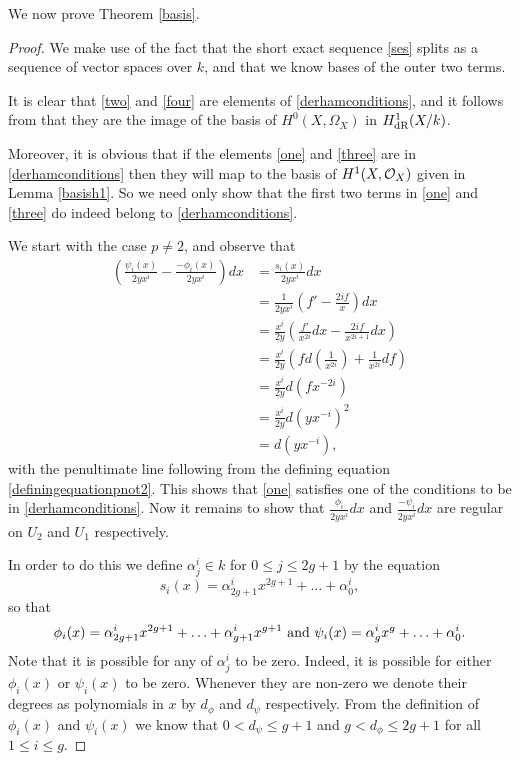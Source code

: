 We now prove Theorem \ref{basis}.

\begin{proof}
We make use of the fact that the short exact sequence \eqref{ses} splits as a sequence of vector spaces over $k$, and that we know bases of the outer two terms.

It is clear that \eqref{two} and \eqref{four} are elements of \eqref{derhamconditions}, and it follows from \cite[Thm 6.1]{faithfulaction} that they are the image of the basis of $H^0(X,\Omega_X)$ in $H_{\text {dR}}^1(X/k)$.

Moreover, it is obvious that if the elements \eqref{one} and \eqref{three} are in \eqref{derhamconditions} then they will map to the basis of $H^1(X,\mathcal{O}_X)$ given in Lemma \ref{basish1}.
So we need only show that the first two terms in \eqref{one} and \eqref{three} do indeed belong to \eqref{derhamconditions}.


We start with the case $p\neq 2$, and observe that
\begin{align*}
\left(  \frac{\psi_i(x)}{2yx^i}  - \frac{-\phi_i(x)}{2yx^i} \right) dx & =  \frac{s_i(x)}{2yx^i} dx \\
& =  \frac{1}{2yx^i} \left( f' - \frac{2if}{x} \right) dx \\
& =  \frac{x^i}{2y} \left( \frac{f'}{x^{2i}}dx -\frac{2if}{x^{2i+1}} dx \right) \\
& =  \frac{x^i}{2y} \left( fd\left(\frac{1}{x^{2i}}\right) + \frac{1}{x^{2i}}df \right) \\
& =  \frac{x^i}{2y}d(fx^{-2i}) \\
& =  \frac{x^i}{2y} d\left(yx^{-i}\right)^2 \\
& =  d(yx^{-i}),
\end{align*}
with the penultimate line following from the defining equation \eqref{definingequationpnot2}.
This shows that \eqref{one} satisfies one of the conditions to be in \eqref{derhamconditions}.
Now it remains to show that $\frac{\phi_i}{2yx^i}dx$ and $\frac{-\psi_i}{2yx^i}dx$ are regular on $U_2$ and $U_1$ respectively.



In order to do this we define $\alpha^i_j \in k$ for $0\leq j \leq 2g+1$ by the equation
\[
s_i(x) = \alpha^i_{2g+1}x^{2g+1} + \ldots + \alpha^i_0,
\]
so that
\[
\phi_i(x) = \alpha^i_{2g+1}x^{2g+1} + \ldots + \alpha^i_{g+1}x^{g+1} \ {\rm and } \ \psi_i(x) = \alpha^i_gx^g + \ldots + \alpha^i_0.
\]
Note that it is possible for any of $\alpha^i_j$ to be zero. Indeed, it is possible for either $\phi_i(x)$ or $\psi_i(x)$ to be zero.
Whenever they are non-zero we denote their degrees as polynomials in $x$ by $d_\phi$ and $d_\psi$ respectively. From the definition of $\phi_i(x)$ and $\psi_i(x)$ we know that $0 < d_\psi \leq g+1$ and $g < d_\phi \leq 2g+1$ for all $1 \leq i \leq g$.



\end{proof}
